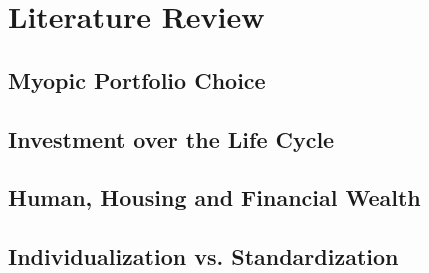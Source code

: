 \chapter{Literature Review}
\label{litreview}

\section{Myopic Portfolio Choice}
\section{Investment over the Life Cycle}
\section{Human, Housing and Financial Wealth}
\section{Individualization vs. Standardization}
